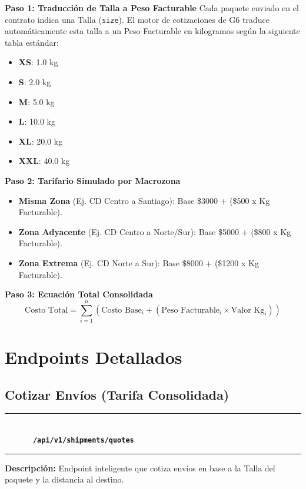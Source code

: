 \documentclass[11pt, a4paper]{article}
\newcommand{\httpmethod}[2]{%
  \colorbox{#1}{\textcolor{white}{\textbf{\small\textsf{#2}}}}%
}
\newcommand{\routeheader}[3]{%
  \noindent\rule{\textwidth}{1.5pt}\\[0.3em]
  \httpmethod{#1}{#2}\;\texttt{\bfseries #3}\\[0.3em]
  \rule{\textwidth}{0.4pt}
  \vspace{0.3cm}
}
\begin{document}
\textbf{Paso 1: Traducción de Talla a Peso Facturable}
Cada paquete enviado en el contrato indica una Talla (\texttt{size}). El motor de cotizaciones de G6 traduce automáticamente esta talla a un Peso Facturable en kilogramos según la siguiente tabla estándar:
\begin{itemize}[noitemsep]
  \item \textbf{XS}: 1.0 kg
  \item \textbf{S}: 2.0 kg
  \item \textbf{M}: 5.0 kg
  \item \textbf{L}: 10.0 kg
  \item \textbf{XL}: 20.0 kg
  \item \textbf{XXL}: 40.0 kg
\end{itemize}

\textbf{Paso 2: Tarifario Simulado por Macrozona}
\begin{itemize}[noitemsep]
  \item \textbf{Misma Zona} (Ej. CD Centro a Santiago): Base \$3000 + (\$500 x Kg Facturable).
  \item \textbf{Zona Adyacente} (Ej. CD Centro a Norte/Sur): Base \$5000 + (\$800 x Kg Facturable).
  \item \textbf{Zona Extrema} (Ej. CD Norte a Sur): Base \$8000 + (\$1200 x Kg Facturable).
\end{itemize}

\textbf{Paso 3: Ecuación Total Consolidada}
$$ \text{Costo Total} = \sum_{i=1}^{n} \left( \text{Costo Base}_i + (\text{Peso Facturable}_i \times \text{Valor Kg}_i) \right) $$

\section{Endpoints Detallados}

\subsection{Cotizar Envíos (Tarifa Consolidada)}

\routeheader{post}{POST}{/api/v1/shipments/quotes}

\textbf{Descripción:} Endpoint inteligente que cotiza envíos en base a la Talla del paquete y la distancia al destino.
\end{document}
